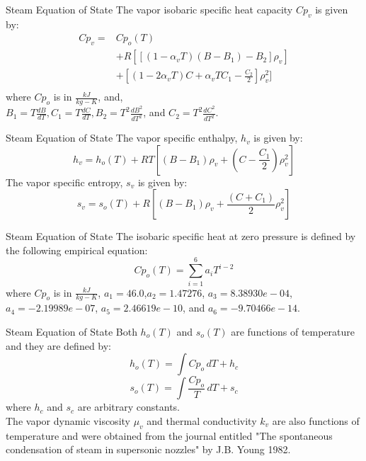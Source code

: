 \begin{frame}{Steam Equation of State\cite{ansys2011ansys}}
    The vapor isobaric specific heat capacity $Cp_{v}$ is given by:
    \begin{equation}
       \begin{split}
           Cp_{v} = & Cp_{o}(T) 
                      \\ 
                    & + R[[(1-\alpha_{v}T)(B-B_{1})-B_{2}]\rho_{v}] \\
                    & + [(1-2\alpha_{v}T)C+\alpha_{v}TC_{1}-\frac{C_{2}}{2}]\rho_{v}^2] \\
       \end{split}
    \end{equation}
    where $Cp_{o}$ is in $\frac{kJ}{kg-K}$, and, \\
    $B_{1} = T \frac{dB}{dT}, C_{1} = T\frac{dC}{dT}, B_{2} = T^{2}\frac{dB^{2}}{dT^{2}}$, and $C_2 = T^{2} \frac{dC^{2}}{dT^{2}}$.
\end{frame}

\begin{frame}{Steam Equation of State\cite{ansys2011ansys}}
The vapor specific enthalpy, $h_{v}$ is given by:
    \begin{equation}
        h_{v} = h_{o}(T) + RT[(B - B_{1})\rho_{v} + (C-\frac{C_{1}}{2})\rho_{v}^2]
    \end{equation}
The vapor specific entropy, $s_{v}$ is given by:
    \begin{equation}
        s_{v} = s_{o}(T) + R[(B - B_{1})\rho_{v} + \frac{(C+{C_{1}})}{2}\rho_{v}^2]
    \end{equation}
\end{frame}

\begin{frame}{Steam Equation of State\cite{ansys2011ansys}}
    The isobaric specific heat at zero pressure is defined by the following empirical equation:
    \begin{equation}
        Cp_{o}(T) = \sum_{i=1}^{6} a_{i}T^{i-2}
    \end{equation}
    where $Cp_{o}$ is in $\frac{kJ}{kg-K}$, $a_{1}=46.0$,$a_{2}=1.47276$, $a_{3}=8.38930e-04$,$a_{4}=-2.19989e-07$, $a_{5}=2.46619e-10$, and $a_{6}=-9.70466e-14$.
\end{frame}

\begin{frame}{Steam Equation of State\cite{ansys2011ansys}}
    Both $h_{o}(T)$ and $s_{o}(T)$ are functions of temperature and they are defined by:
    \begin{equation}
        h_{o}(T) = \int Cp_{o} \,dT + h_{c}
    \end{equation}
    \begin{equation}
        s_{o}(T) = \int \frac{Cp_{o}}{T} \,dT + s_{c}
    \end{equation}
    where $h_{c}$ and $s_{c}$ are arbitrary constants.\\
    The vapor dynamic viscosity $\mu_{v}$ and thermal conductivity $k_{v}$ are also functions of temperature and were obtained from the journal entitled "The spontaneous condensation of steam in supersonic nozzles" by J.B. Young 1982\cite{young1982spontaneous}.
\end{frame}

